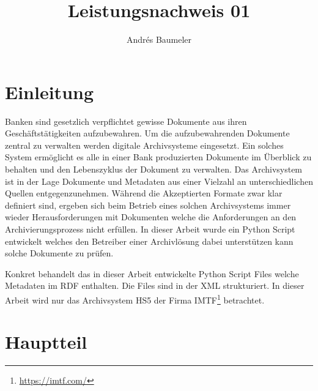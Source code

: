 \documentclass[a4paper,oneside, 12pt]{report}
\title{Leistungsnachweis 01}
\author{Andrés Baumeler}
\begin{document}

\pagestyle{empty} %





\cleardoublepage
\tableofcontents %
\cleardoublepage %

\pagestyle{plain} %



\chapter{Einleitung}\label{sec:motivation}
Banken sind gesetzlich verpflichtet gewisse Dokumente aus ihren Geschäftstätigkeiten aufzubewahren. Um die aufzubewahrenden Dokumente zentral zu verwalten werden digitale Archivsysteme eingesetzt. Ein solches System ermöglicht es alle in einer Bank produzierten Dokumente im Überblick zu behalten und den Lebenszyklus der Dokument zu verwalten. Das Archivsystem ist in der Lage Dokumente und Metadaten aus einer Vielzahl an unterschiedlichen Quellen entgegenzunehmen. Während die Akzeptierten Formate zwar klar definiert sind, ergeben sich beim Betrieb eines solchen Archivsystems immer wieder Herausforderungen mit Dokumenten welche die Anforderungen an den Archivierungsprozess nicht erfüllen. In dieser Arbeit wurde ein Python Script entwickelt welches den Betreiber einer Archivlösung dabei unterstützen kann solche Dokumente zu prüfen.

Konkret behandelt das in dieser Arbeit entwickelte Python Script Files welche Metadaten im \ac{RDF} enthalten. Die Files sind in der \ac{XML} strukturiert. In dieser Arbeit wird nur das Archivsystem \ac{HS5} der Firma IMTF\footnote{\url{https://imtf.com/}} betrachtet.

\chapter{Hauptteil}\label{sec:motivation}
\end{document}
